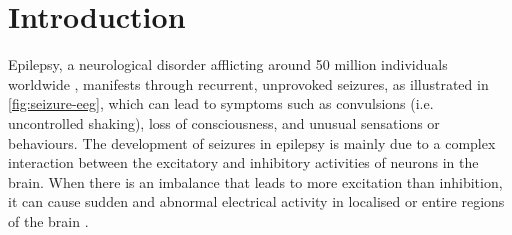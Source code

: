 \documentclass[10pt]{article}
\begin{document}
\begin{sloppypar}
  \begin{abstract}
  \end{abstract}

  \pagebreak


  \section{Introduction}
  \label{sec:introduction}

  Epilepsy, a neurological disorder afflicting around 50 million individuals worldwide \citep{world2019epilepsy}, manifests through recurrent, unprovoked seizures, as illustrated in \autoref{fig:seizure-eeg}, which can lead to symptoms such as convulsions (i.e. uncontrolled shaking), loss of consciousness, and unusual sensations or behaviours. The development of seizures in epilepsy is mainly due to a complex interaction between the excitatory and inhibitory activities of neurons in the brain. When there is an imbalance that leads to more excitation than inhibition, it can cause sudden and abnormal electrical activity in localised or entire regions of the brain \citep{robinson_propagation_1997}.


\end{sloppypar}
\end{document}
